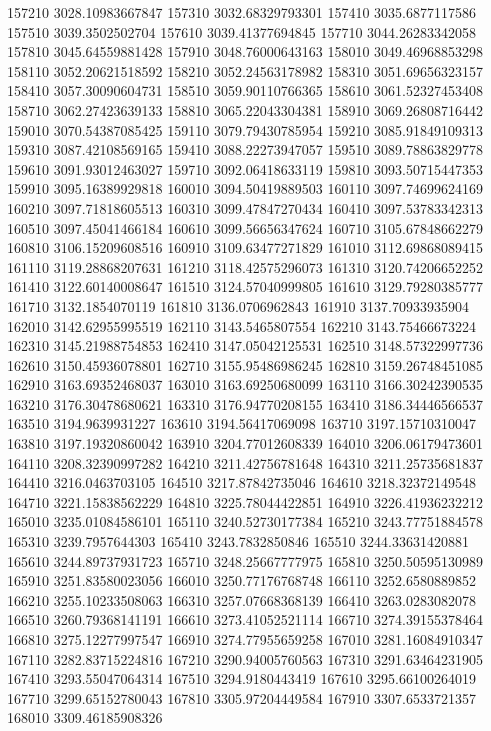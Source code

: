 {157210 3028.10983667847
157310 3032.68329793301
157410 3035.6877117586
157510 3039.3502502704
157610 3039.41377694845
157710 3044.26283342058
157810 3045.64559881428
157910 3048.76000643163
158010 3049.46968853298
158110 3052.20621518592
158210 3052.24563178982
158310 3051.69656323157
158410 3057.30090604731
158510 3059.90110766365
158610 3061.52327453408
158710 3062.27423639133
158810 3065.22043304381
158910 3069.26808716442
159010 3070.54387085425
159110 3079.79430785954
159210 3085.91849109313
159310 3087.42108569165
159410 3088.22273947057
159510 3089.78863829778
159610 3091.93012463027
159710 3092.06418633119
159810 3093.50715447353
159910 3095.16389929818
160010 3094.50419889503
160110 3097.74699624169
160210 3097.71818605513
160310 3099.47847270434
160410 3097.53783342313
160510 3097.45041466184
160610 3099.56656347624
160710 3105.67848662279
160810 3106.15209608516
160910 3109.63477271829
161010 3112.69868089415
161110 3119.28868207631
161210 3118.42575296073
161310 3120.74206652252
161410 3122.60140008647
161510 3124.57040999805
161610 3129.79280385777
161710 3132.1854070119
161810 3136.0706962843
161910 3137.70933935904
162010 3142.62955995519
162110 3143.5465807554
162210 3143.75466673224
162310 3145.21988754853
162410 3147.05042125531
162510 3148.57322997736
162610 3150.45936078801
162710 3155.95486986245
162810 3159.26748451085
162910 3163.69352468037
163010 3163.69250680099
163110 3166.30242390535
163210 3176.30478680621
163310 3176.94770208155
163410 3186.34446566537
163510 3194.9639931227
163610 3194.56417069098
163710 3197.15710310047
163810 3197.19320860042
163910 3204.77012608339
164010 3206.06179473601
164110 3208.32390997282
164210 3211.42756781648
164310 3211.25735681837
164410 3216.0463703105
164510 3217.87842735046
164610 3218.32372149548
164710 3221.15838562229
164810 3225.78044422851
164910 3226.41936232212
165010 3235.01084586101
165110 3240.52730177384
165210 3243.77751884578
165310 3239.7957644303
165410 3243.7832850846
165510 3244.33631420881
165610 3244.89737931723
165710 3248.25667777975
165810 3250.50595130989
165910 3251.83580023056
166010 3250.77176768748
166110 3252.6580889852
166210 3255.10233508063
166310 3257.07668368139
166410 3263.0283082078
166510 3260.79368141191
166610 3273.41052521114
166710 3274.39155378464
166810 3275.12277997547
166910 3274.77955659258
167010 3281.16084910347
167110 3282.83715224816
167210 3290.94005760563
167310 3291.63464231905
167410 3293.55047064314
167510 3294.9180443419
167610 3295.66100264019
167710 3299.65152780043
167810 3305.97204449584
167910 3307.6533721357
168010 3309.46185908326
}

